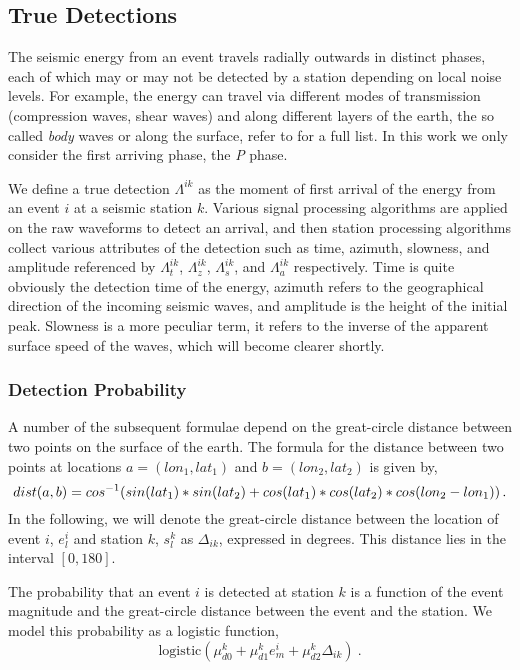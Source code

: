 \documentclass[12pt,letterpaper,onecolumn,oneside]{article}
\begin{document}
\subsection{True Detections}

The seismic energy from an event travels radially outwards in distinct
phases, each of which may or may not be detected by a station depending
on local noise levels. For example, the energy can travel via different
modes of transmission (compression waves, shear waves) and along
different layers of the earth, the so called {\em body} waves or along
the surface, refer to \citet{iaspei2011} for a full list. In this work we only
consider the first arriving phase, the {\em P} phase.

We define a true detection $\Lambda^{ik}$ as the moment of first arrival
of the energy from an event $i$ at a seismic station $k$. Various signal
processing algorithms are applied on the raw waveforms to detect an
arrival, and then station processing algorithms collect various
attributes of the
detection such as time, azimuth, slowness, and amplitude referenced by
$\Lambda^{ik}_t$, $\Lambda^{ik}_z$, $\Lambda^{ik}_s$, and
$\Lambda^{ik}_a$ respectively. Time is quite obviously the detection time
of the energy, azimuth refers to the geographical direction of the
incoming seismic waves, and amplitude is the height of the initial
peak. Slowness is a more peculiar term, it refers to the inverse of the
apparent surface speed of the waves, which will become clearer shortly.

\subsubsection{Detection Probability}

A number of the subsequent formulae depend on the great-circle distance
between two points on the surface of the earth. The formula for the
distance between two points at locations $a=(lon_1, lat_1)$ and 
$b=(lon_2, lat_2)$ is given by,
\[
dist(a,b) \\
= cos^{-1} ( sin(lat_1) * sin(lat_2) + cos(lat_1) * cos(lat_2) *
cos(lon_2 - lon_1) ) \, .
\]
In the following, we will denote the great-circle distance between the
location of event $i$, $e^i_l$ and station $k$, $s^k_l$ as
$\Delta_{ik}$, expressed in degrees. This distance lies in the interval
$[0,180]$.

The probability that an event $i$ is detected at station $k$ is a
function of the event magnitude and the great-circle distance between
the event and the station. We model this probability as a logistic
function,
\[\text{logistic}
(\mu_{d0}^k + \mu_{d1}^k e^i_m + \mu_{d2}^k \Delta_{ik}) \ .\]
\end{document}
